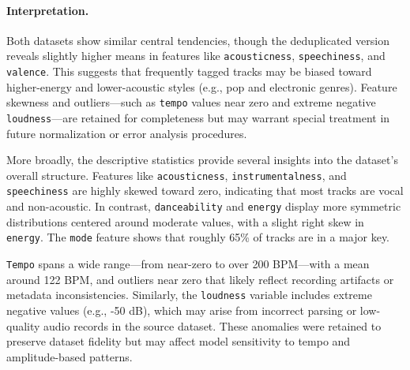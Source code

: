 \documentclass{article}
\begin{document}
\begin{table}[H]
\centering
{}
\caption{Sample of matched emotion labels with track metadata. Each row represents a unique song associated with one or more emotion labels.}
\label{tab:sample_emotion_table}
\end{table}


\paragraph{Interpretation.}
Both datasets show similar central tendencies, though the deduplicated version reveals slightly higher means in features like \texttt{acousticness}, \texttt{speechiness}, and \texttt{valence}. This suggests that frequently tagged tracks may be biased toward higher-energy and lower-acoustic styles (e.g., pop and electronic genres). Feature skewness and outliers—such as \texttt{tempo} values near zero and extreme negative \texttt{loudness}—are retained for completeness but may warrant special treatment in future normalization or error analysis procedures.

More broadly, the descriptive statistics provide several insights into the dataset's overall structure. Features like \texttt{acousticness}, \texttt{instrumentalness}, and \texttt{speechiness} are highly skewed toward zero, indicating that most tracks are vocal and non-acoustic. In contrast, \texttt{danceability} and \texttt{energy} display more symmetric distributions centered around moderate values, with a slight right skew in \texttt{energy}. The \texttt{mode} feature shows that roughly 65\% of tracks are in a major key. 

\texttt{Tempo} spans a wide range—from near-zero to over 200 BPM—with a mean around 122 BPM, and outliers near zero that likely reflect recording artifacts or metadata inconsistencies. Similarly, the \texttt{loudness} variable includes extreme negative values (e.g., -50 dB), which may arise from incorrect parsing or low-quality audio records in the source dataset. These anomalies were retained to preserve dataset fidelity but may affect model sensitivity to tempo and amplitude-based patterns.
\end{document}
